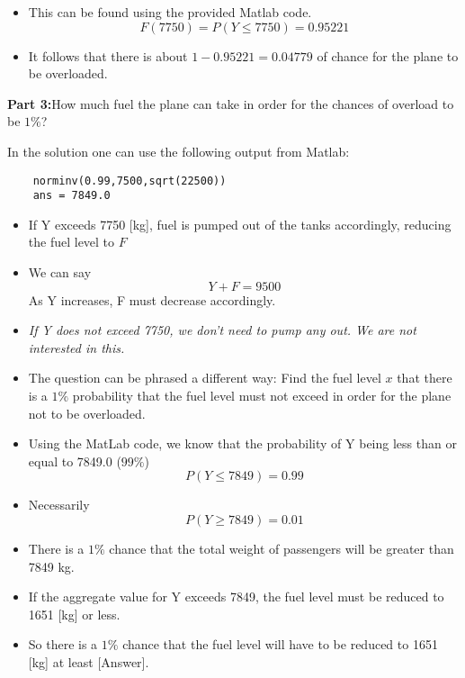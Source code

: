 {\begin{itemize}
		where F is the cdf of $N(7500, 22500)$.
		
		\item This can be found using the provided Matlab code.
		\[  F(7750) = P(Y \leq 7750) = 0.95221 \]
		\item It follows that there is about $1 - 0.95221 = 0.04779$ of chance for the plane to be overloaded.
	\end{itemize}
	
	\noindent\textbf{Part 3:}How much fuel the plane can take in order for the chances of overload to be $1\%$?
	
	In the solution one can use the following output from Matlab:
	\begin{verbatim}
	norminv(0.99,7500,sqrt(22500))
	ans = 7849.0
	\end{verbatim}
}

\normalsize{
	
	\begin{itemize}
		\item If Y exceeds 7750 [kg], fuel is pumped out of the tanks accordingly, reducing the fuel level to $F$
		\item We can say \[ Y + F = 9500 \]
		As Y increases, F must decrease accordingly.
		\item \emph{If Y does not exceed 7750, we don't need to pump any out. We are not interested in this.}
		\item The question can be phrased a different way: Find the fuel level $x$ that there is a $1\%$ probability that the fuel level must not exceed in order for the plane not to be overloaded.
		
	\end{itemize}
}



\begin{itemize}
	\item  Using the MatLab code, we know that the probability of Y being less than or equal to 7849.0 ($99\%$)
	\[ P(Y \leq 7849) = 0.99\]
	\item Necessarily  \[ P(Y \geq 7849) = 0.01\]
	\item There is a $1\%$ chance that the total weight of passengers will be greater than 7849 kg.
	\item If the aggregate value for Y exceeds 7849, the fuel level must be reduced to 1651 [kg] or less.
	\item So there is a $1\%$ chance that the fuel level will have to be reduced to 1651 [kg] at least [Answer].
	
\end{itemize}



